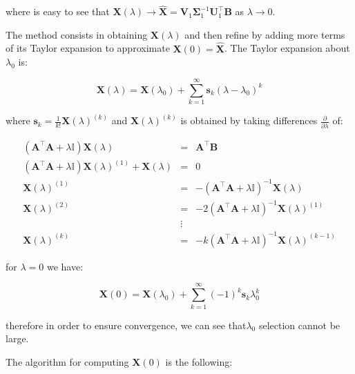 \noindent where is easy to see that $\mathbf{X}(\lambda) \rightarrow
\mathbf{\hat{X}}=\mathbf{V}_1 \mathbf{\Sigma}_1^{-1}\mathbf{U}_1^\top
\mathbf{B}$ as $\lambda \rightarrow 0$. 

The method consists in obtaining $\mathbf{X}(\lambda)$ and then refine
by adding more terms of its Taylor expansion to approximate
$\mathbf{X}(0) = \mathbf{\hat{X}}$. The Taylor expansion about $\lambda_0$ is:

\begin{equation}
\label{eq:taylor}
    \mathbf{X}(\lambda)=\mathbf{X}(\lambda_0) + \sum_{k=1}^\infty
    \mathbf{s}_k(\lambda-\lambda_0)^{k}
\end{equation}


\noindent where $\mathbf{s}_k=\frac{1}{k!}\mathbf{X}(\lambda)^{(k)}$
and $\mathbf{X}(\lambda)^{(k)}$ is obtained by taking differences 
$\frac{\partial}{\partial \lambda}$ of:  

\begin{eqnarray*}
(\mathbf{A}^\top \mathbf{A}+ \lambda\mathbb{I}) \mathbf{X}(\lambda) & = & \mathbf{A}^\top \mathbf{B}\\
(\mathbf{A}^\top \mathbf{A}+ \lambda\mathbb{I}) \mathbf{X}(\lambda)^{(1)} + \mathbf{X}(\lambda)& = & 0 \\
\mathbf{X}(\lambda)^{(1)}  &=& -(\mathbf{A}^\top \mathbf{A}+ \lambda\mathbb{I}) ^{-1} \mathbf{X}(\lambda) \\
\mathbf{X}(\lambda)^{(2)}  &=& -2(\mathbf{A}^\top \mathbf{A}+ \lambda\mathbb{I}) ^{-1} \mathbf{X}(\lambda)^{(1)} \\
& \vdots & \\
\mathbf{X}(\lambda)^{(k)}  &=& -k(\mathbf{A}^\top \mathbf{A}+ \lambda\mathbb{I}) ^{-1} \mathbf{X}(\lambda)^{(k-1)} 
\end{eqnarray*}



\noindent for $\lambda=0$ we have:

\begin{equation}
\label{eq:taylor}
    \mathbf{X}(0)=\mathbf{X}(\lambda_0) + \sum_{k=1}^\infty
     (-1)^k \mathbf{s}_k \lambda_0^k
\end{equation}


\noindent therefore in order to ensure convergence, we can see that$\lambda_0$
selection cannot be large. 

The algorithm for computing $\mathbf{X}(0)$ is the following:

